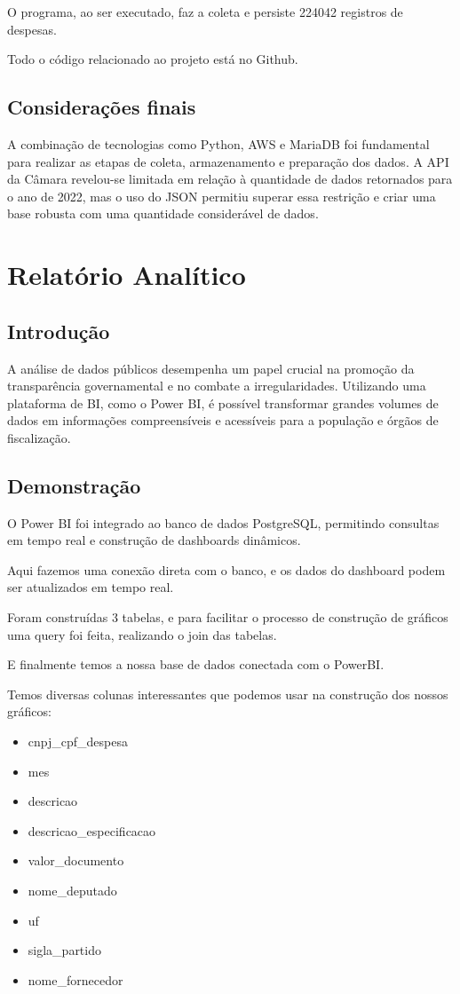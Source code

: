 \documentclass[12pt, a4paper]{article}
\begin{document}
O programa, ao ser executado, faz a coleta e persiste 224042 registros de despesas.

Todo o código relacionado ao projeto está no Github\cite{github_repo}.

\subsection{Considerações finais}
A combinação de tecnologias como Python, AWS e MariaDB foi fundamental para realizar as etapas de coleta, armazenamento e preparação dos dados. A API da Câmara revelou-se limitada em relação à quantidade de dados retornados para o ano de 2022, mas o uso do JSON permitiu superar essa restrição e criar uma base robusta com uma quantidade considerável de dados.


\section{Relatório Analítico}
\subsection{Introdução}

A análise de dados públicos desempenha um papel crucial na promoção da transparência governamental e no combate a irregularidades. Utilizando uma plataforma de BI, como o Power BI, é possível transformar grandes volumes de dados em informações compreensíveis e acessíveis para a população e órgãos de fiscalização.

\subsection{Demonstração}

O Power BI foi integrado ao banco de dados PostgreSQL, permitindo consultas em tempo real e construção de dashboards dinâmicos.

Aqui fazemos uma conexão direta com o banco, e os dados do dashboard podem ser atualizados em tempo real.

Foram construídas 3 tabelas, e para facilitar o processo de construção de gráficos uma query foi feita, realizando o join das tabelas.

E finalmente temos a nossa base de dados conectada com o PowerBI.

Temos diversas colunas interessantes que podemos usar na construção dos nossos gráficos:
\begin{itemize}	
	\item cnpj\_cpf\_despesa
	\item mes
	\item descricao
	\item descricao\_especificacao
	\item valor\_documento
	\item nome\_deputado
	\item uf
	\item sigla\_partido
	\item nome\_fornecedor
\end{itemize}
\end{document}
